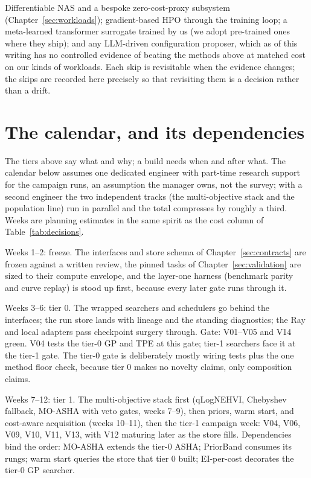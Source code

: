 Differentiable NAS and a bespoke zero-cost-proxy subsystem
(Chapter~\ref{sec:workloads}); gradient-based HPO through the training
loop; a meta-learned transformer surrogate trained by us (we adopt
pre-trained ones where they ship); and any LLM-driven configuration
proposer, which as of this writing has no controlled evidence of beating
the methods above at matched cost on our kinds of workloads. Each skip
is revisitable when the evidence changes; the skips are recorded here
precisely so that revisiting them is a decision rather than a drift.

\section{The calendar, and its dependencies}
\label{sec:calendar}

The tiers above say what and why; a build needs when and after what.
The calendar below assumes one dedicated engineer with part-time
research support for the campaign runs, an assumption the manager
owns, not the survey; with a second engineer the two independent
tracks (the multi-objective stack and the population line) run in
parallel and the total compresses by roughly a third. Weeks are
planning estimates in the same spirit as the cost column of
Table~\ref{tab:decisions}.

Weeks 1--2: freeze. The interfaces and store schema of
Chapter~\ref{sec:contracts} are frozen against a written review, the
pinned tasks of Chapter~\ref{sec:validation} are sized to their
compute envelope, and the layer-one harness (benchmark parity and
curve replay) is stood up first, because every later gate runs
through it.

Weeks 3--6: tier 0. The wrapped searchers and schedulers go behind
the interfaces; the run store lands with lineage and the standing
diagnostics; the Ray and local adapters pass checkpoint surgery
through. Gate: V01--V05 and V14 green. V04 tests the tier-0 GP and
TPE at this gate; tier-1 searchers face it at the tier-1 gate. The
tier-0 gate is deliberately mostly wiring tests plus the one method
floor check, because tier 0 makes no novelty claims, only composition
claims.

Weeks 7--12: tier 1. The multi-objective stack first (qLogNEHVI,
Chebyshev fallback, MO-ASHA with veto gates, weeks 7--9), then
priors, warm start, and cost-aware acquisition (weeks 10--11), then
the tier-1 campaign week: V04, V06, V09, V10, V11, V13, with V12
maturing later as the store fills. Dependencies bind the order:
MO-ASHA extends the tier-0 ASHA; PriorBand consumes its rungs; warm
start queries the store that tier 0 built; EI-per-cost decorates the
tier-0 GP searcher.

